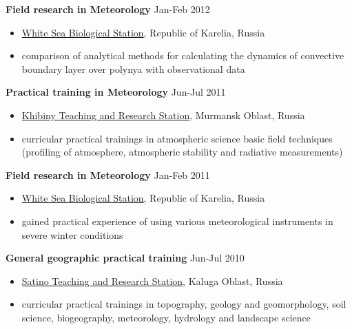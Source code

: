 \documentclass[10pt]{article}
\newenvironment{innerlist}[1][\enskip$\filledsquare$]%
        {\begin{itemize}[#1,leftmargin=*,rightmargin=1mm,parsep=0pt,itemsep=0pt,topsep=0pt,partopsep=0pt]}
        {\end{itemize}}
\begin{document}
\vspace{.1in}
\textbf{Field research in Meteorology} \hfill {Jan-Feb 2012}
\begin{innerlist}
\item[] \href{http://en.wsbs-msu.ru/}{White Sea Biological Station}, Republic of Karelia, Russia \
\item\small comparison of analytical methods for calculating the dynamics of convective boundary
            layer over polynya with observational data
\end{innerlist}

\vspace{.1in}
\textbf{Practical training in Meteorology} \hfill {Jun-Jul 2011}
\begin{innerlist}
\item[] \href{http://www.eng.geogr.msu.ru/practics/stations/khibiny/}{Khibiny Teaching and Research Station}, Murmansk Oblast, Russia \
\item\small curricular practical trainings in atmospheric science basic field techniques (profiling of atmosphere, atmospheric stability and radiative measurements)
\end{innerlist}

\vspace{.1in}
\vspace{.1in}
\textbf{Field research in Meteorology} \hfill {Jan-Feb 2011}
\begin{innerlist}
\item[] \href{http://en.wsbs-msu.ru/}{White Sea Biological Station}, Republic of Karelia, Russia
\item\small gained practical experience of using various meteorological instruments in severe winter conditions
\end{innerlist}

\vspace{.1in}
\textbf{General geographic practical training} \hfill {Jun-Jul 2010}
\begin{innerlist}
\item[] \href{http://www.eng.geogr.msu.ru/practics/stations/satin/}{Satino Teaching and Research Station}, Kaluga Oblast, Russia \
\item\small curricular practical trainings in topography, geology and geomorphology, soil science, biogeography, meteorology, hydrology and landscape science
\end{innerlist}
\end{document}
